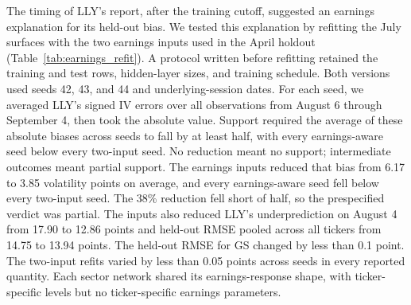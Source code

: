 The timing of LLY's report, after the training cutoff, suggested an earnings explanation for its held-out bias. We tested this explanation by refitting the July surfaces with the two earnings inputs used in the April holdout (Table~\ref{tab:earnings_refit}). A protocol written before refitting retained the training and test rows, hidden-layer sizes, and training schedule. Both versions used seeds 42, 43, and 44 and underlying-session dates. For each seed, we averaged LLY's signed IV errors over all observations from August 6 through September 4, then took the absolute value. Support required the average of these absolute biases across seeds to fall by at least half, with every earnings-aware seed below every two-input seed. No reduction meant no support; intermediate outcomes meant partial support. The earnings inputs reduced that bias from 6.17 to 3.85 volatility points on average, and every earnings-aware seed fell below every two-input seed. The 38\% reduction fell short of half, so the prespecified verdict was partial. The inputs also reduced LLY's underprediction on August 4 from 17.90 to 12.86 points and held-out RMSE pooled across all tickers from 14.75 to 13.94 points. The held-out RMSE for GS changed by less than 0.1 point. The two-input refits varied by less than 0.05 points across seeds in every reported quantity. Each sector network shared its earnings-response shape, with ticker-specific levels but no ticker-specific earnings parameters.

\begin{table}[H]
\centering
\caption{Bias and RMSE of the July-cutoff sector surfaces refitted with and without earnings inputs. Values are means across training seeds 42, 43, and 44, with seed ranges in parentheses. Bias is mean predicted minus observed IV. The post-report LLY biases were positive for every seed, so their signed and absolute values coincide. Bias and RMSE are in volatility percentage points. The two-input fit with seed 42 is the published surface. The earnings inputs are signed calendar days to the ticker's nearest report, clipped to $[-30,30]$, and absolute days to the nearest same-sector peer report, capped at 30. For ETFs, both inputs equal the same absolute day distance to the nearest report among all non-ETF stocks, capped at 30.}\label{tab:earnings_refit}

\end{table}
\FloatBarrier

